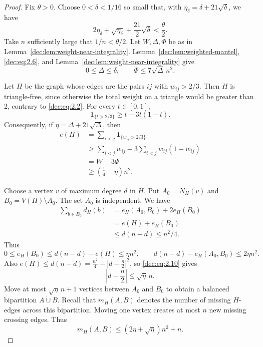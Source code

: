 \documentclass[11pt]{article}
\numberwithin{equation}{section}
\theoremstyle{remark}
\newcommand{\dotcupunion}{\mathbin{\dot\cup}}
\begin{document}
\begin{proof}
Fix \(\theta>0\).  Choose \(0<\delta<1/16\) so small that, with \( \eta_\delta=\delta+21\sqrt{\delta}\), we have
\begin{equation*}
 2\eta_\delta+\sqrt{\eta_\delta}
 +\frac{21}{2}\sqrt{\delta}<\frac{\theta}{2}.
\end{equation*}
Take \(n\) sufficiently large that \(1/n<\theta/2\). Let \(W,\Delta,\Phi\) be as in
Lemma~\ref{dec:lem:weight-near-integrality}. Lemma~\ref{dec:lem:weighted-mantel}, \eqref{dec:eq:2.6},
and Lemma~\ref{dec:lem:weight-near-integrality} give
\begin{equation}\label{dec:eq:2.9}
 0\le\Delta\le\delta,\qquad
 \Phi\le7\sqrt{\Delta}\,n^2.
\end{equation}

Let \(H\) be the graph whose edges are the pairs \(ij\) with \(w_{ij}>2/3\).
Then \(H\) is triangle-free, since otherwise the total weight on a triangle would be greater than \(2\),
contrary to \eqref{dec:eq:2.2}. For every \(t\in[0,1]\),
\begin{equation*}
 \mathbf1_{\{t>2/3\}}\ge t-3t(1-t).
\end{equation*}
Consequently, if \(\eta=\Delta+21\sqrt{\Delta}\), then
\begin{equation}\label{dec:eq:2.10}
\begin{aligned}
 e(H)&=\sum_{i<j}\mathbf1_{\{w_{ij}>2/3\}}\\
 &\ge\sum_{i<j}w_{ij}-3\sum_{i<j}w_{ij}(1-w_{ij})\\
 &= W-3\Phi\\
 &\ge\left(\frac14-\eta\right)n^2.
\end{aligned}
\end{equation}

Choose a vertex \(v\) of maximum degree \(d\) in \(H\). Put
\(A_0=N_H(v)\) and \(B_0=V(H)\setminus A_0\).  The set \(A_0\) is
independent. We have
\begin{equation*}
\begin{aligned}
 \sum_{b\in B_0}d_H(b)
 &=e_H(A_0,B_0)+2e_H(B_0)\\
 &=e(H)+e_H(B_0)\\
 &\le d(n-d)\le n^2/4.
\end{aligned}
\end{equation*}
Thus
\begin{equation*}
 0\le e_H(B_0)\le d(n-d)-e(H)\le\eta n^2,\qquad
 d(n-d)-e_H(A_0,B_0)\le2\eta n^2.
\end{equation*}
Also \(e(H)\le d(n-d) = \frac{n^2}{4}-\left|d-\frac n2\right|^2\), so \eqref{dec:eq:2.10} gives
\begin{equation*}
 \left|d-\frac n2\right|\le\sqrt{\eta}\,n.
\end{equation*}
Move at most \(\sqrt{\eta}\,n+1\) vertices between \(A_0\) and \(B_0\)
to obtain a balanced bipartition \(A\dotcupunion B\). Recall that
\(m_H(A,B)\) denotes the number of missing \(H\)-edges across this bipartition.
Moving one vertex creates at most \(n\) new missing crossing edges. Thus
\begin{equation}\label{dec:eq:2.12}
 m_H(A,B)\le(2\eta+\sqrt{\eta})n^2+n.
\end{equation}


\end{proof}
\end{document}
